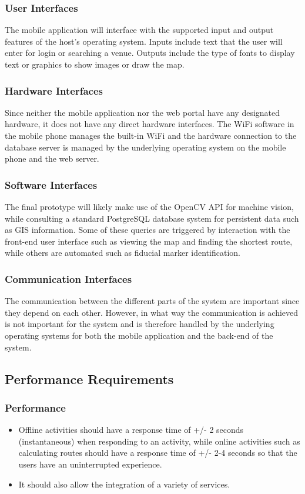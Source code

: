 \documentclass{article}
\begin{document}
		\subsubsection{User Interfaces}
		        The mobile application will interface with the supported input and output features of the host's operating system. Inputs include text that the user will enter for login or searching a venue. Outputs include the type of fonts to display text or graphics to show images or draw the map.

		\subsubsection{Hardware Interfaces}
			Since neither the mobile application nor the web portal have any designated hardware, it does not have any direct hardware interfaces. The WiFi software in the mobile phone manages the built-in WiFi and the hardware connection to the database server is managed by the underlying operating system on the mobile phone and the web server.

		\subsubsection{Software Interfaces}
		The final prototype will likely make use of the OpenCV API for machine vision, while consulting a standard PostgreSQL database system for persistent data such as GIS information. Some of these queries are triggered by interaction with the front-end user interface such as viewing the map and finding the shortest route, while others are automated such as fiducial marker identification.

		\subsubsection{Communication Interfaces}
			The communication between the different parts of the system are important since they depend on each other. However, in what way the communication is achieved is not important for the system and is therefore handled by the underlying operating systems for both the mobile application and the back-end of the system.
	
		
	\subsection{Performance Requirements}
		\subsubsection{Performance}
			\begin{itemize}
			\item Offline activities should have a response time of +/- 2 seconds (instantaneous) when responding to an activity, while online activities such as calculating routes should have a response time of +/- 2-4 seconds so that the users have an uninterrupted experience.
			\item It should also allow the integration of a variety of services.\\
			\end{itemize}
\end{document}
